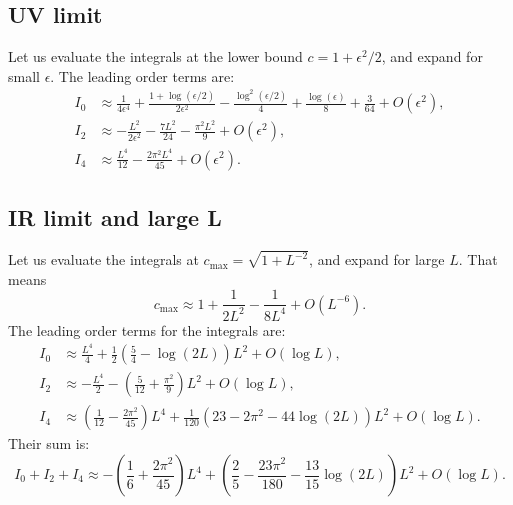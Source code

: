 \subsection{UV limit}\label{sec:UVlimit}
Let us evaluate the integrals at the lower bound $c = 1 + \epsilon^2/2$, and expand for small $\epsilon$. The leading order terms are:
\begin{align}
 I_0 &\approx \frac{1}{4 \epsilon ^4} +\frac{1+\log \left(\epsilon/2\right)}{2 \epsilon ^2}-\frac{ \log ^2\left(\epsilon/2\right)}{4}+\frac{\log (\epsilon )}{8} + \frac{3}{64} + O(\epsilon^2),\\
%     
I_2 & \approx -\frac{L^2}{2 \epsilon^2}-\frac{7 L^2}{24}-\frac{\pi ^2 L^2}{9} + O(\epsilon^2),\\
%    
 I_4 & \approx \frac{L^4}{12}-\frac{2 \pi ^2 L^4}{45} + O(\epsilon^2). 
\end{align}


\subsection{IR limit and large L} \label{sec:IRlimit}
Let us evaluate the integrals at $c_\text{max}=\sqrt{1+L^{-2}}$, and expand for large $L$. That means 
\begin{equation}
 c_\text{max} \approx 1 + \frac{1}{2 L^2} - \frac{1}{8 L^4} + O(L^{-6}).
\end{equation}
The leading order terms for the integrals are:
\begin{align}
 I_0 &\approx \frac{L^4}{4}+\frac{1}{2} \left(\frac{5}{4} - \log(2 L)\right) L^2 + O(\log L),\\
%     
I_2 & \approx -\frac{L^4}{2} -\left(\frac{5}{12}+\frac{\pi^2}{9}\right) L^2 + O(\log L),\\
%    
 I_4 & \approx \left(\frac{1}{12}-\frac{2 \pi ^2}{45}\right) L^4+ \frac{1}{120} \left(23 -2 \pi^2 - 44 \log(2 L) \right)L^2+ O(\log L). 
\end{align}
Their sum is:
\begin{equation}\label{eq:IatUV}
 I_0+I_2+I_4 \approx -\left(\frac{1}{6}+\frac{2 \pi ^2}{45}\right) L^4
             +\left(\frac{2}{5}-\frac{23 \pi ^2}{180}-\frac{ 13}{15} \log(2 L)\right)L^2 + O(\log L).
\end{equation}


